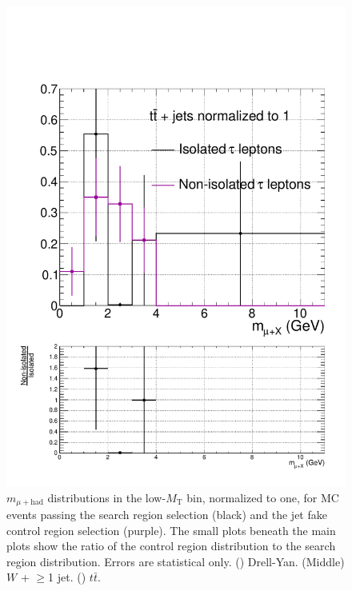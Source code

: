 \begin{figure}[hbtp]
\begin{center}
    \includegraphics[width=0.8\cmsFigWidth]{figures/isoVsNonIsoTaus_TTJets_lowMT_v87}
    \caption{$m_{\mu+\text{had}}$ distributions in the low-$M_{\text{T}}$ bin, normalized to one, for MC events passing the search region selection (black) and the jet fake control region selection (purple).  The small plots beneath the main plots show the ratio of the control region distribution to the search region distribution.  Errors are statistical only.  (\cmsLeft) Drell-Yan.  (Middle) $W$ + $\ge$1 jet.  (\cmsRight) $t\bar{t}$.}
    \label{fig:MC-regA-vs-regB-main-lowMT}
  \end{center}
\end{figure}

